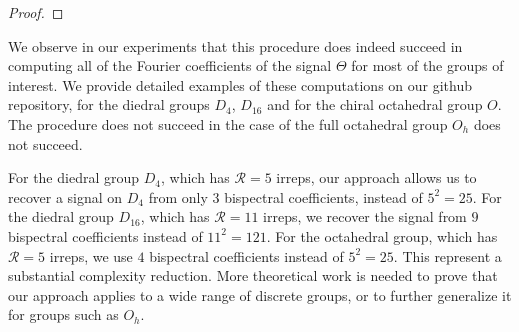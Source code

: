 \begin{proof}

\end{proof}

    We observe in our experiments that this procedure does indeed succeed in computing all of the Fourier coefficients of the signal $\Theta$ for most of the groups of interest. We provide detailed examples of these computations on our github repository, for the diedral groups $D_4$, $D_{16}$ and for the chiral octahedral group $O$. The procedure does not succeed in the case of the full octahedral group $O_h$ does not succeed.

    For the diedral group $D_4$, which has $\mathcal{R} = 5$ irreps, our approach allows us to recover a signal on $D_4$ from only 3 bispectral coefficients, instead of $5^2 = 25$. For the diedral group $D_{16}$, which has $\mathcal{R} = 11$ irreps, we recover the signal from $9$ bispectral coefficients instead of $11^2 = 121$. For the octahedral group, which has $\mathcal{R} = 5$ irreps, we use $4$ bispectral coefficients instead of $5^2 = 25$. This represent a substantial complexity reduction. More theoretical work is needed to prove that our approach applies to a wide range of discrete groups, or to further generalize it for groups such as $O_h$.

